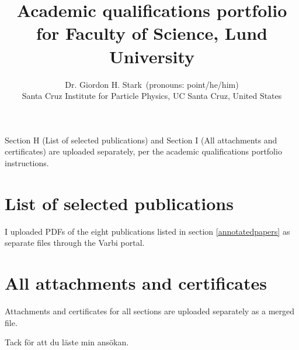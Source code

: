 \documentclass[10pt,a4paper,sans, oneside]{book}
\title{Academic qualifications portfolio for Faculty of Science, Lund University}
\author{Dr. Giordon H. Stark\ {\small\color{gray}(pronouns: point/he/him)}\\[1em]\faIcon{university} Santa Cruz Institute for Particle Physics, UC Santa Cruz, United States}
\date{}
\begin{document}
  \maketitle

  \tableofcontents

	\vspace{1cm}
	\noindent Section H (List of selected publications) and Section I (All attachments and certificates) are uploaded separately, per the academic qualifications portfolio instructions.

  

  

  

  

  

  

  

	\vspace{2cm}

	\section{List of selected publications}
	I uploaded PDFs of the eight publications listed in section \ref{annotatedpapers} as separate files through the Varbi portal.

	\section{All attachments and certificates}
	Attachments and certificates for all sections are uploaded separately as a merged file.

	\vspace{0.5cm}
	\noindent Tack f\"or att du l\"aste min ans\"okan.
\end{document}
